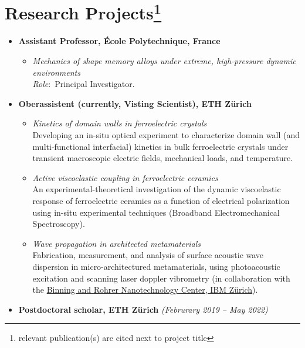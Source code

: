 \documentclass[a4paper,10pt, oneside]{article}
\begin{document}
	\section*{{Research Projects}\footnote[2]{relevant publication(s) are cited next to project title}}
	\begin{itemize}[wide, labelwidth=!, labelindent=-1em]
		\item[]\textbf{Assistant Professor, \'{E}cole Polytechnique, France} 
		\begin{itemize}[wide, labelwidth=!, labelindent=0em]
			\item \textit{Mechanics of shape memory alloys under extreme, high-pressure dynamic environments} \\
			\textit{Role}:~Principal Investigator. 
		\end{itemize}
		\vspace*{1em}
		\item[]\textbf{Oberassistent (currently, Visting Scientist), ETH Z\"{u}rich}
		\begin{itemize}[wide, labelwidth=!, labelindent=0em]
			\item \textit{Kinetics of domain walls in ferroelectric crystals} \\
			Developing an in-situ optical experiment to characterize domain wall (and multi-functional interfacial) kinetics in bulk ferroelectric crystals under transient macroscopic electric fields, mechanical loads, and temperature.
			\item\textit{Active viscoelastic coupling in ferroelectric ceramics} \\
			An experimental-theoretical investigation of the dynamic viscoelastic response of ferroelectric ceramics as a function of electrical polarization using in-situ experimental techniques (Broadband Electromechanical Spectroscopy).
			\item \textit{Wave propagation in architected metamaterials} \\
			Fabrication, measurement, and analysis of surface acoustic wave dispersion in micro-architectured metamaterials, using photoacoustic excitation and scanning laser doppler vibrometry (in collaboration with the \href{https://www.zurich.ibm.com/brnc/}{Binning and Rohrer Nanotechnology Center, IBM Z\"{u}rich}).		
		\end{itemize}
		\vspace*{1em}
		\item[]\textbf{Postdoctoral scholar, ETH Z\"{u}rich} \hfill \textit{(Februrary 2019 -- May 2022)}
		\begin{itemize}[wide, labelwidth=!, labelindent=0em]

\end{itemize}
\end{itemize}
\end{document}

